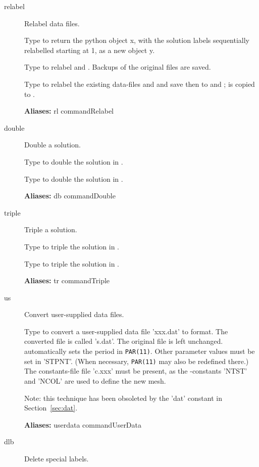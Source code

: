 \documentclass[12pt]{report}
\begin{document}
\begin{description}
\item[relabel]
Relabel data files.

    Type  to return the python object x, with the solution
    labels sequentially relabelled starting at 1, as a new object y.

    Type  to relabel  and
    . Backups of the
    original files are saved.

    Type  to relabel the existing data-files
     and  and save then to  and
    ;  is copied to .

\textbf{Aliases:} rl commandRelabel

\item[double]
Double a solution.

    Type  to double the solution in .

    Type  to double the solution in
    .
    
\textbf{Aliases:} db commandDouble

\item[triple]
Triple a solution.

    Type  to triple the solution in .

    Type  to triple the solution in
    .
    
\textbf{Aliases:} tr commandTriple

\item[us]
Convert user-supplied data files.

    Type  to convert a user-supplied data file 'xxx.dat' to
    \AUTO format. The converted file is called 's.dat'.  The original
    file is left unchanged.  \AUTO automatically sets the period in
    {\tt PAR(11)}.  Other parameter values must be set in 'STPNT'. (When
    necessary, {\tt PAR(11)} may also be redefined there.)  The
    constants-file file 'c.xxx' must be present, as the \AUTO-constants
    'NTST' and 'NCOL' are used to define the new mesh.

    Note: this technique has been obsoleted by the 'dat' \AUTO constant
    in Section~\ref{sec:dat}.
    
\textbf{Aliases:} userdata commandUserData

\item[dlb]
Delete special labels.


\end{description}
\end{document}
